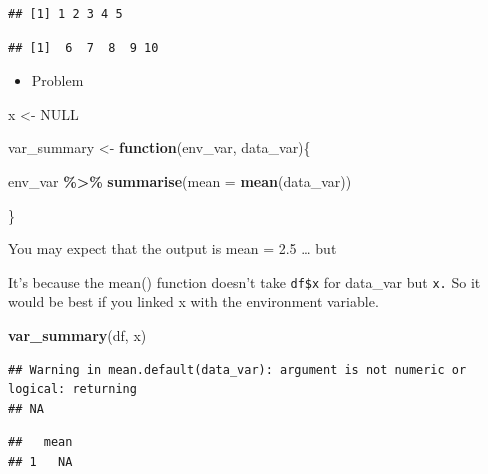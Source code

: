 \documentclass[
]{book}
\newenvironment{Shaded}{\begin{snugshade}}{\end{snugshade}}
\newcommand{\AttributeTok}[1]{\textcolor[rgb]{0.13,0.29,0.53}{#1}}
\newcommand{\ConstantTok}[1]{\textcolor[rgb]{0.56,0.35,0.01}{#1}}
\newcommand{\ControlFlowTok}[1]{\textcolor[rgb]{0.13,0.29,0.53}{\textbf{#1}}}
\newcommand{\FunctionTok}[1]{\textcolor[rgb]{0.13,0.29,0.53}{\textbf{#1}}}
\newcommand{\NormalTok}[1]{#1}
\newcommand{\OtherTok}[1]{\textcolor[rgb]{0.56,0.35,0.01}{#1}}
\newcommand{\SpecialCharTok}[1]{\textcolor[rgb]{0.81,0.36,0.00}{\textbf{#1}}}
\providecommand{\tightlist}{%
  \setlength{\itemsep}{0pt}\setlength{\parskip}{0pt}}
\begin{document}
\begin{verbatim}
## [1] 1 2 3 4 5
\end{verbatim}

\begin{Shaded}
\end{Shaded}

\begin{verbatim}
## [1]  6  7  8  9 10
\end{verbatim}

\begin{itemize}
\tightlist
\item
  Problem
\end{itemize}

\begin{Shaded}
\begin{Highlighting}[]
\NormalTok{x }\OtherTok{\textless{}{-}} \ConstantTok{NULL} 

\NormalTok{var\_summary }\OtherTok{\textless{}{-}} \ControlFlowTok{function}\NormalTok{(env\_var, data\_var)\{}
 
\NormalTok{   env\_var }\SpecialCharTok{\%\textgreater{}\%}
    \FunctionTok{summarise}\NormalTok{(}\AttributeTok{mean =} \FunctionTok{mean}\NormalTok{(data\_var))}

\NormalTok{\}}
\end{Highlighting}
\end{Shaded}

You may expect that the output is mean = 2.5 \ldots{} but

It's because the mean() function doesn't take \texttt{df\$x} for data\_var but \texttt{x.} So it would be best if you linked x with the environment variable.

\begin{Shaded}
\begin{Highlighting}[]
\FunctionTok{var\_summary}\NormalTok{(df, x)}
\end{Highlighting}
\end{Shaded}

\begin{verbatim}
## Warning in mean.default(data_var): argument is not numeric or logical: returning
## NA
\end{verbatim}

\begin{verbatim}
##   mean
## 1   NA
\end{verbatim}
\end{document}
